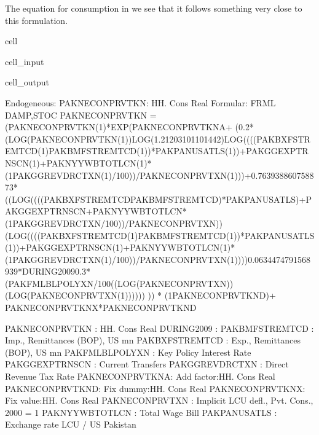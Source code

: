 \documentclass[letterpaper,10pt,english]{jupyterBook}
\begin{document}
\sphinxAtStartPar
The equation for consumption in  we see that it follows something very close to this formulation.

\begin{sphinxuseclass}{cell}\begin{sphinxVerbatimInput}

\begin{sphinxuseclass}{cell_input}
\begin{sphinxVerbatim}[commandchars=\\\{\}]
\end{sphinxVerbatim}

\end{sphinxuseclass}\end{sphinxVerbatimInput}
\begin{sphinxVerbatimOutput}

\begin{sphinxuseclass}{cell_output}
\begin{sphinxVerbatim}[commandchars=\\\{\}]
Endogeneous: PAKNECONPRVTKN: HH. Cons Real
Formular: FRML \PYGZlt{}DAMP,STOC\PYGZgt{} PAKNECONPRVTKN = (PAKNECONPRVTKN(\PYGZhy{}1)*EXP(PAKNECONPRVTKN\PYGZus{}A+ (\PYGZhy{}0.2*(LOG(PAKNECONPRVTKN(\PYGZhy{}1))\PYGZhy{}LOG(1.21203101101442)\PYGZhy{}LOG((((PAKBXFSTREMTCD(\PYGZhy{}1)\PYGZhy{}PAKBMFSTREMTCD(\PYGZhy{}1))*PAKPANUSATLS(\PYGZhy{}1))+PAKGGEXPTRNSCN(\PYGZhy{}1)+PAKNYYWBTOTLCN(\PYGZhy{}1)*(1\PYGZhy{}PAKGGREVDRCTXN(\PYGZhy{}1)/100))/PAKNECONPRVTXN(\PYGZhy{}1)))+0.763938860758873*((LOG((((PAKBXFSTREMTCD\PYGZhy{}PAKBMFSTREMTCD)*PAKPANUSATLS)+PAKGGEXPTRNSCN+PAKNYYWBTOTLCN*(1\PYGZhy{}PAKGGREVDRCTXN/100))/PAKNECONPRVTXN))\PYGZhy{}(LOG((((PAKBXFSTREMTCD(\PYGZhy{}1)\PYGZhy{}PAKBMFSTREMTCD(\PYGZhy{}1))*PAKPANUSATLS(\PYGZhy{}1))+PAKGGEXPTRNSCN(\PYGZhy{}1)+PAKNYYWBTOTLCN(\PYGZhy{}1)*(1\PYGZhy{}PAKGGREVDRCTXN(\PYGZhy{}1)/100))/PAKNECONPRVTXN(\PYGZhy{}1))))\PYGZhy{}0.0634474791568939*DURING\PYGZus{}2009\PYGZhy{}0.3*(PAKFMLBLPOLYXN/100\PYGZhy{}((LOG(PAKNECONPRVTXN))\PYGZhy{}(LOG(PAKNECONPRVTXN(\PYGZhy{}1)))))) )) * (1\PYGZhy{}PAKNECONPRVTKN\PYGZus{}D)+ PAKNECONPRVTKN\PYGZus{}X*PAKNECONPRVTKN\PYGZus{}D  \PYGZdl{}

PAKNECONPRVTKN  : HH. Cons Real
DURING\PYGZus{}2009     : 
PAKBMFSTREMTCD  : Imp., Remittances (BOP), US\PYGZdl{} mn
PAKBXFSTREMTCD  : Exp., Remittances (BOP), US\PYGZdl{} mn
PAKFMLBLPOLYXN  : Key Policy Interest Rate
PAKGGEXPTRNSCN  : Current Transfers
PAKGGREVDRCTXN  : Direct Revenue Tax Rate
PAKNECONPRVTKN\PYGZus{}A: Add factor:HH. Cons Real
PAKNECONPRVTKN\PYGZus{}D: Fix dummy:HH. Cons Real
PAKNECONPRVTKN\PYGZus{}X: Fix value:HH. Cons Real
PAKNECONPRVTXN  : Implicit LCU defl., Pvt. Cons., 2000 = 1
PAKNYYWBTOTLCN  : Total Wage Bill
PAKPANUSATLS    : Exchange rate LCU / US\PYGZdl{} \PYGZhy{} Pakistan
\end{sphinxVerbatim}

\end{sphinxuseclass}\end{sphinxVerbatimOutput}

\end{sphinxuseclass}
\end{document}
